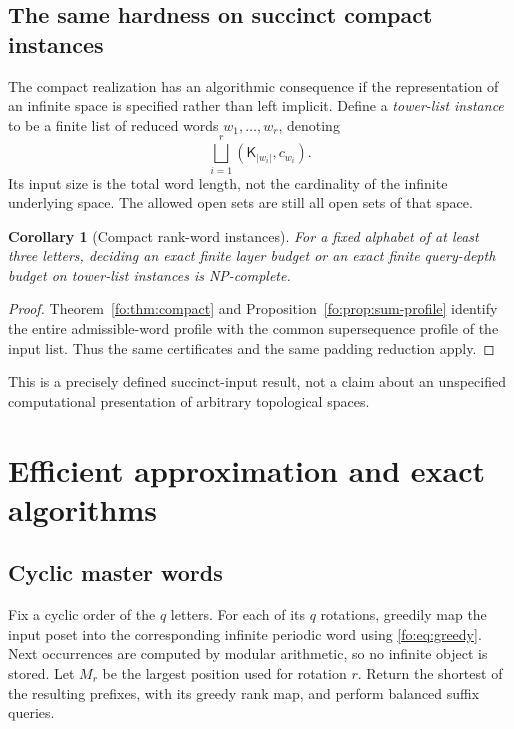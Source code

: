 \documentclass[11pt,letterpaper]{article}
\numberwithin{equation}{section}
\newtheorem{corollary}[corollary]{Corollary}
\theoremstyle{definition}
\theoremstyle{remark}
\theoremstyle{definition}
\newcommand{\len}[1]{\lvert #1\rvert}
\newcommand{\Tw}{\mathsf K}
\begin{document}
\subsection{The same hardness on succinct compact instances}

The compact realization has an algorithmic consequence if the representation
of an infinite space is specified rather than left implicit. Define a
\emph{tower-list instance} to be a finite list of reduced words
$w_1,\ldots,w_r$, denoting
\[
 \bigsqcup_{i=1}^r(\Tw_{\len{w_i}},c_{w_i}).
\]
Its input size is the total word length, not the cardinality of the infinite
underlying space. The allowed open sets are still all open sets of that space.

\begin{corollary}[Compact rank-word instances]
For a fixed alphabet of at least three letters, deciding an exact finite layer
budget or an exact finite query-depth budget on tower-list instances is
NP-complete.
\end{corollary}
\begin{proof}
Theorem~\ref{fo:thm:compact} and Proposition~\ref{fo:prop:sum-profile} identify the
entire admissible-word profile with the common supersequence profile of the
input list. Thus the same certificates and the same padding reduction apply.
\end{proof}

This is a precisely defined succinct-input result, not a claim about an
unspecified computational presentation of arbitrary topological spaces.

\section{Efficient approximation and exact algorithms}
\label{fo:sec:algorithms}

\subsection{Cyclic master words}
Fix a cyclic order of the $q$ letters. For each of its $q$ rotations, greedily
map the input poset into the corresponding infinite periodic word using
\eqref{fo:eq:greedy}. Next occurrences are computed by modular arithmetic, so no
infinite object is stored. Let $M_r$ be the largest position used for rotation
$r$. Return the shortest of the resulting prefixes, with its greedy rank map,
and perform balanced suffix queries.
\end{document}
